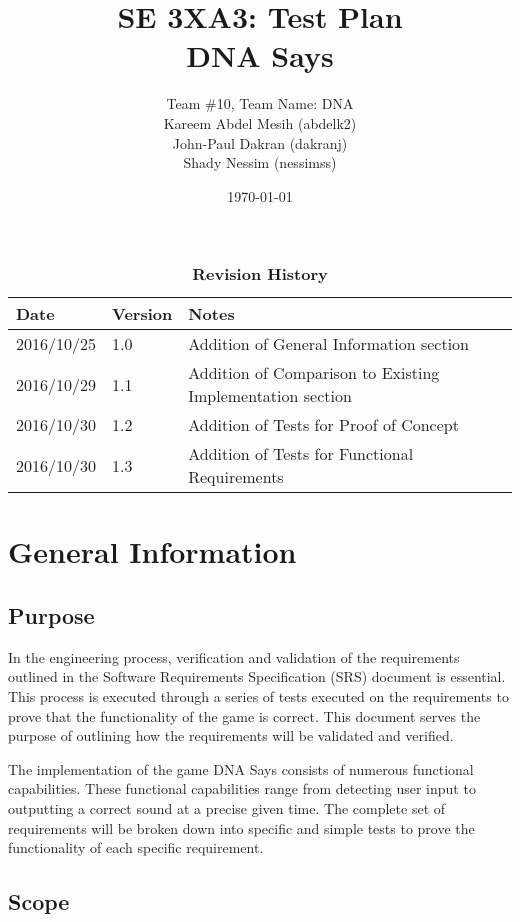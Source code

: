 \documentclass[12pt, titlepage]{article}
\title{SE 3XA3: Test Plan\\DNA Says}
\author{Team \#10, Team Name: DNA
		\\ Kareem Abdel Mesih (abdelk2)
		\\ John-Paul Dakran (dakranj)
		\\ Shady Nessim (nessimss)
}
\date{\today}
\begin{document}
\maketitle
{}
\tableofcontents
\listoftables
\listoffigures
\begin{table}[bp]
\caption{\bf Revision History}
\begin{tabularx}{\textwidth}{p{3cm}p{2cm}X}
\toprule {\bf Date} & {\bf Version} & {\bf Notes}\\
\midrule
2016/10/25 & 1.0 & Addition of General Information section \\
2016/10/29 & 1.1 & Addition of Comparison to Existing Implementation section\\
2016/10/30 & 1.2 & Addition of Tests for Proof of Concept\\
2016/10/30 & 1.3 & Addition of Tests for Functional Requirements\\
\bottomrule
\end{tabularx}
\end{table}
\newpage
{}
\section{General Information}
\subsection{Purpose}

\par In the engineering process, verification and validation of the requirements outlined in the Software Requirements Specification (SRS) document is essential. This process is executed through a series of tests executed on the requirements to prove that the functionality of the game is correct. This document serves the purpose of outlining how the requirements will be validated and verified.
\\
\par The implementation of the game DNA Says consists of numerous functional capabilities. These functional capabilities range from detecting user input to outputting a correct sound at a precise given time. The complete set of requirements will be broken down into specific and simple tests to prove the functionality of each specific requirement. 


\subsection{Scope}
\end{document}
